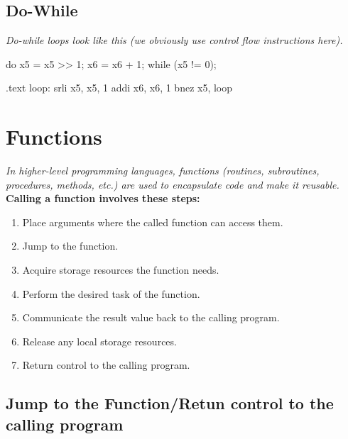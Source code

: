 \subsection{Do-While}
\textit{Do-while loops look like this (we obviously use control flow instructions here).} \\
\begin{minipage}[htp]{0.4\textwidth}
\begin{cc}
do {
    x5 = x5 >> 1;
    x6 = x6 + 1;
} while (x5 != 0);
\end{cc}    
\end{minipage}
\hfill
\vline
\hfill
\begin{minipage}[htp]{0.4\textwidth}
\begin{assembly}
.text
loop:
    srli x5, x5, 1
    addi x6, x6, 1
    bnez x5, loop
\end{assembly}
\end{minipage}

\section{Functions}
\textit{In higher-level programming languages, functions (routines, subroutines, procedures, methods, etc.) are used to encapsulate code and make it reusable. } \\
\textbf{Calling a function involves these steps:}
\begin{enumerate}
    \item Place arguments where the called function can access them.
    \item Jump to the function.
    \item Acquire storage resources the function needs.
    \item Perform the desired task of the function.
    \item Communicate the result value back to the calling program.
    \item Release any local storage resources.
    \item Return control to the calling program.
\end{enumerate}
\subsection{Jump to the Function/Retun control to the calling program}
